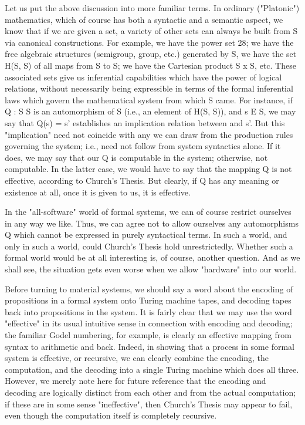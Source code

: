 \documentclass[a4paper,12pt]{article}
\begin{document}
Let us put the above discussion into more familiar terms. In ordinary
("Platonic") mathematics, which of course has both a syntactic and a semantic aspect,
we know that if we are given a set, a variety of other sets
can always be built from S via canonical constructions. For example, we
have the power set 28; we have the free algebraic structures (semigroup,
group, etc.)  generated by S, we have the set H(S, S) of all maps from
S to S; we have the Cartesian product S x S, etc. These associated sets
give us inferential capabilities which have the power of logical relations,
without necessarily being expressible in terms of the formal inferential laws
which govern the mathematical system from which S came. For instance,
if Q : S 	S is an automorphism of S (i.e., an element of H(S, S)), and
s E S, we may say that Q(s) = s' establishes an implication relation between and s'.
But this "implication" need not coincide with any we can draw
from the production rules governing the system; i.e., need not follow from
system syntactics alone. If it does, we may say that our Q is computable in
the system; otherwise, not computable. In the latter case, we would have to
say that the mapping Q is not effective, according to Church's Thesis. But
clearly, if Q has any meaning or existence at all, once it is given to us, it is
effective.

In the "all-software" world of formal systems, we can of course restrict ourselves in any way we like.
Thus, we can agree not to allow ourselves any automorphisms Q which cannot be expressed in purely syntactical
terms. In such a world, and only in such a world, could Church's Thesis hold unrestrictedly.
Whether such a formal world would be at all interesting is, of course, another question.
And as we shall see, the situation gets even worse when we allow "hardware" into our world.

Before turning to material systems, we should say a word about the encoding of propositions
in a formal system onto Turing machine tapes, and decoding tapes back into propositions in the system.
It is fairly clear that we may use the word "effective" in its usual intuitive sense in connection
with encoding and decoding; the familiar Godel numbering, for example, is
clearly an effective mapping from syntax to arithmetic and back. Indeed,
in showing that a process in some formal system is effective, or recursive,
we can clearly combine the encoding, the computation, and the decoding
into a single Turing machine which does all three. However, we merely note
here for future reference that the encoding and decoding are logically distinct from each other
and from the actual computation; if these are in some sense "ineffective", then Church's Thesis
may appear to fail, even though the computation itself is completely recursive.
\end{document}
